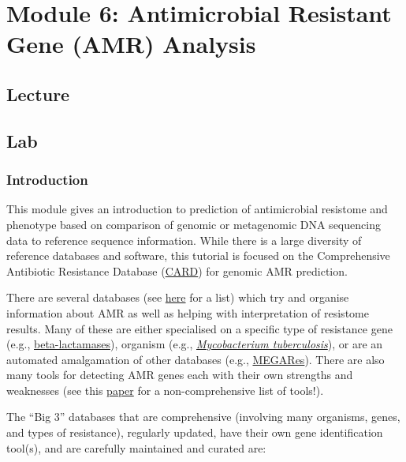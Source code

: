 \documentclass[
]{book}
\begin{document}
\chapter{Module 6: Antimicrobial Resistant Gene (AMR) Analysis}\label{module-6-antimicrobial-resistant-gene-amr-analysis}

\section{Lecture}\label{lecture-5}

\section{Lab}\label{lab-3}

\subsection{Introduction}\label{introduction-1}

This module gives an introduction to prediction of antimicrobial resistome and phenotype based on comparison of genomic or metagenomic DNA sequencing data to reference sequence information. While there is a large diversity of reference databases and software, this tutorial is focused on the Comprehensive Antibiotic Resistance Database (\href{http://card.mcmaster.ca/}{CARD}) for genomic AMR prediction.

There are several databases (see \href{https://www.nature.com/articles/s41576-019-0108-4/tables/2}{here} for a list) which try and organise information about AMR as well as helping with interpretation of resistome results. Many of these are either specialised on a specific type of resistance gene (e.g., \href{http://bldb.eu/}{beta-lactamases}), organism (e.g., \href{https://github.com/jodyphelan/tbdb}{\emph{Mycobacterium tuberculosis}}), or are an automated amalgamation of other databases (e.g., \href{https://megares.meglab.org/}{MEGARes}). There are also many tools for detecting AMR genes each with their own strengths and weaknesses (see this \href{https://www.frontiersin.org/articles/10.3389/fpubh.2019.00242/full}{paper} for a non-comprehensive list of tools!).

The ``Big 3'' databases that are comprehensive (involving many organisms, genes, and types of resistance), regularly updated, have their own gene identification tool(s), and are carefully maintained and curated are:
\end{document}
